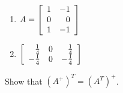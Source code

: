 \begin{multicols}{2}
\begin{ex}
\begin{enumerate}[label={\alph*.}]
\item $A=
\left[ 
\begin{array}{rr}
1 & -1 \\ 
0 & 0 \\ 
1 & -1
\end{array}
\right] $
\end{enumerate}
\begin{sol}
\begin{enumerate}[label={\alph*.}]
\setcounter{enumi}{1}
\item $
\left[ 
\begin{array}{rrr}
\tfrac{1}{4} & 0 & \tfrac{1}{4} \\ 
-\tfrac{1}{4} & 0 & -\tfrac{1}{4}
\end{array}
\right] $
\end{enumerate}
\end{sol}
\end{ex}


\begin{ex}
Show that $(A^{+})^{T}=(A^{T})^{+}$.
\end{ex}
\end{multicols}
